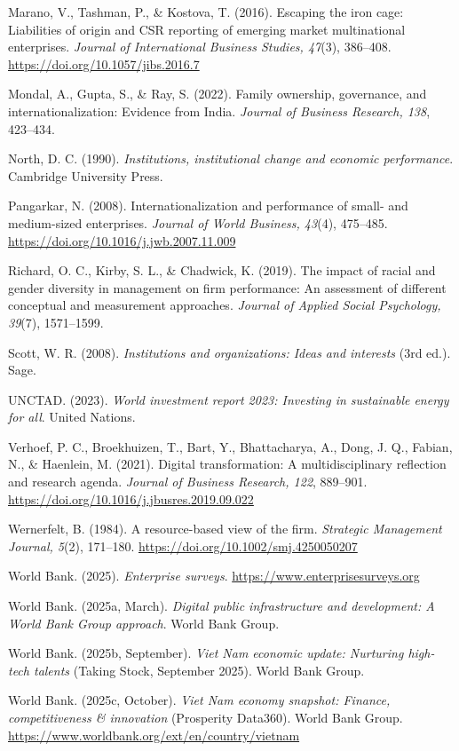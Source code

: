 \documentclass[12pt,a4paper]{article}
\begin{document}
Marano, V., Tashman, P., \& Kostova, T. (2016). Escaping the iron cage:
Liabilities of origin and CSR reporting of emerging market multinational
enterprises. \emph{Journal of International Business Studies, 47}(3),
386--408. \url{https://doi.org/10.1057/jibs.2016.7}

Mondal, A., Gupta, S., \& Ray, S. (2022). Family ownership, governance,
and internationalization: Evidence from India. \emph{Journal of Business
Research, 138}, 423--434.

North, D. C. (1990). \emph{Institutions, institutional change and
economic performance}. Cambridge University Press.

Pangarkar, N. (2008). Internationalization and performance of small- and
medium-sized enterprises. \emph{Journal of World Business, 43}(4),
475--485. \url{https://doi.org/10.1016/j.jwb.2007.11.009}

Richard, O. C., Kirby, S. L., \& Chadwick, K. (2019). The impact of
racial and gender diversity in management on firm performance: An
assessment of different conceptual and measurement approaches.
\emph{Journal of Applied Social Psychology, 39}(7), 1571--1599.

Scott, W. R. (2008). \emph{Institutions and organizations: Ideas and
interests} (3rd ed.). Sage.

UNCTAD. (2023). \emph{World investment report 2023: Investing in
sustainable energy for all}. United Nations.

Verhoef, P. C., Broekhuizen, T., Bart, Y., Bhattacharya, A., Dong, J.
Q., Fabian, N., \& Haenlein, M. (2021). Digital transformation: A
multidisciplinary reflection and research agenda. \emph{Journal of
Business Research, 122}, 889--901.
\url{https://doi.org/10.1016/j.jbusres.2019.09.022}

Wernerfelt, B. (1984). A resource-based view of the firm.
\emph{Strategic Management Journal, 5}(2), 171--180.
\url{https://doi.org/10.1002/smj.4250050207}

World Bank. (2025). \emph{Enterprise surveys}.
\url{https://www.enterprisesurveys.org}

World Bank. (2025a, March). \emph{Digital public infrastructure and
development: A World Bank Group approach}. World Bank Group.

World Bank. (2025b, September). \emph{Viet Nam economic update:
Nurturing high-tech talents} (Taking Stock, September 2025). World Bank
Group.

World Bank. (2025c, October). \emph{Viet Nam economy snapshot: Finance,
competitiveness \& innovation} (Prosperity Data360). World Bank Group.
\url{https://www.worldbank.org/ext/en/country/vietnam}
\end{document}
